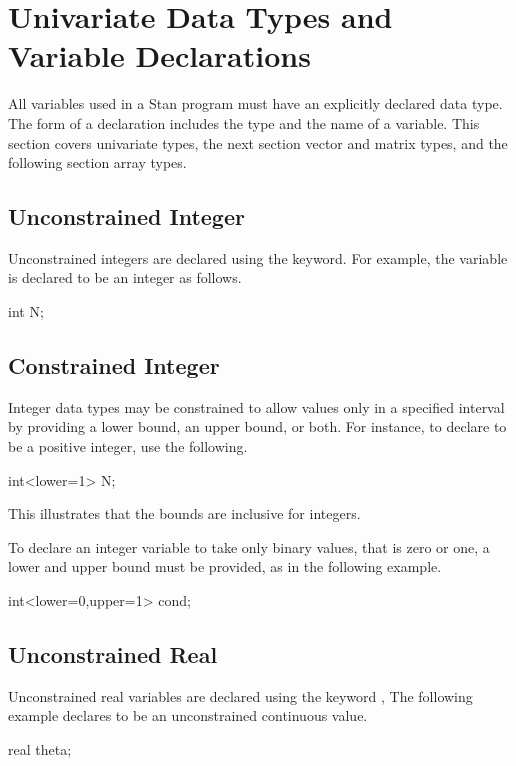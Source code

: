 \section{Univariate Data Types and Variable Declarations}

All variables used in a Stan program must have an explicitly declared
data type.  The form of a declaration includes the type and the name
of a variable.  This section covers univariate types, the next section
vector and matrix types, and the following section array types.

\subsection{Unconstrained Integer}

Unconstrained integers are declared using the  keyword.
For example, the variable  is declared to be an integer as follows.
%
\begin{stancode}
int N;
\end{stancode}
%

\subsection{Constrained Integer}

Integer data types may be constrained to allow values only in a
specified interval by providing a lower bound, an upper bound, or
both.  For instance, to declare  to be a positive integer, use
the following.
%
\begin{stancode}
int<lower=1> N;
\end{stancode}
%
This illustrates that the bounds are inclusive for integers.

To declare an integer variable  to take only binary values,
that is zero or one, a lower and upper bound must be provided, as in
the following example.
%
\begin{stancode}
int<lower=0,upper=1> cond;
\end{stancode}


\subsection{Unconstrained Real}

Unconstrained real variables are declared using the keyword
, The following example declares  to be an
unconstrained continuous value.
%
\begin{stancode}
real theta;
\end{stancode}
%

